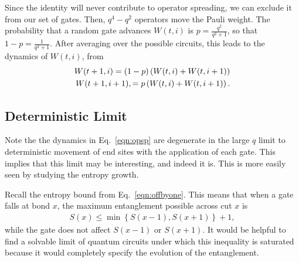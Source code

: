 Since the identity will never contribute to operator spreading, we can exclude it from our set of gates. Then, $q^4-q^2$ operators move the Pauli weight. The probability that a random gate advances $W(t,i)$ is $p = \frac{q^2}{q^2+1}$, so that $1-p = \frac{1}{q^2+1}$. After averaging over the possible circuits, this leads to the dynamics of $W(t,i)$, from~\cite{Keyserlingk}
\begin{align}
W(t+1, i) = (1-p)\left(W(t, i) + W(t, i+1)\right)\nonumber\\
W(t+1, i+1), = p\left(W(t, i) + W(t, i+1)\right). \label{eqn:opsp}
\end{align}
%
%

\subsection{Deterministic Limit}  \label{sub:determ}

Note the the dynamics in Eq.~\ref{eqn:opsp} are degenerate in the large $q$ limit to deterministic movement of end sites with the application of each gate. This implies that this limit may be interesting, and indeed it is. This is more easily seen by studying the entropy growth.

Recall the entropy bound from Eq.~\ref{eqn:offbyone}. This means that when a gate falls at bond $x$, the maximum entanglement possible across cut $x$ is 
\begin{align}
S(x) \le \min\left\lbrace S(x-1), S(x+1)\right\rbrace + 1, \nonumber
\end{align}
while the gate does not affect $S(x-1)$ or $S(x+1)$. It would be helpful to find a solvable limit of quantum circuits under which this inequality is saturated because it would completely specify the evolution of the entanglement. 

